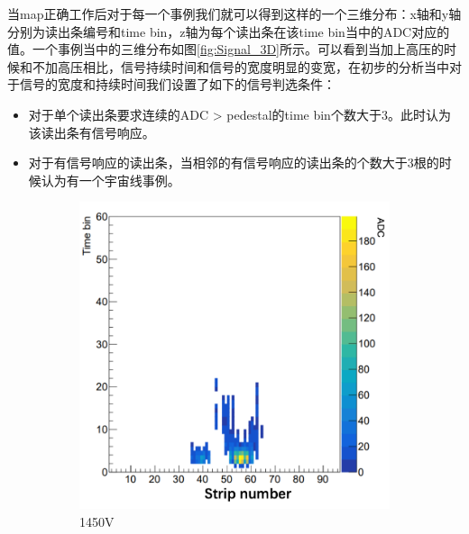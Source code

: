 当map正确工作后对于每一个事例我们就可以得到这样的一个三维分布：x轴和y轴分别为读出条编号和time bin，z轴为每个读出条在该time bin当中的ADC对应的值。一个事例当中的三维分布如图\ref{fig:Signal_3D}所示。可以看到当加上高压的时候和不加高压相比，信号持续时间和信号的宽度明显的变宽，在初步的分析当中对于信号的宽度和持续时间我们设置了如下的信号判选条件：
\begin{itemize}
    \item 对于单个读出条要求连续的ADC > pedestal的time bin个数大于3。此时认为该读出条有信号响应。
    \item 对于有信号响应的读出条，当相邻的有信号响应的读出条的个数大于3根的时候认为有一个宇宙线事例。
\end{itemize}
\begin{figure}[htb]
    \centering
    \begin{subfigure}[b]{0.45\textwidth}
        \centering
        \includegraphics[width=\textwidth,clip]{figures/Chapter3/Strip_TB_ADC.png}
        \caption{1450V}
        \label{fig:Strip_TB_ADC}
    \end{subfigure}
    \hfill
    \begin{subfigure}[b]{0.45\textwidth}
        \centering

\end{subfigure}
\end{figure}
